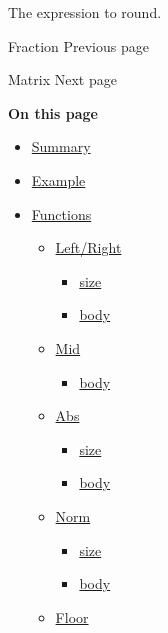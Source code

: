 The expression to round.

\href{/docs/reference/math/frac/}{\pandocbounded{}}

{ Fraction } { Previous page }

\href{/docs/reference/math/mat/}{\pandocbounded{}}

{ Matrix } { Next page }

\textbf{On this page}

\begin{itemize}
\tightlist
\item
  \hyperref[summary]{Summary}
\item
  \hyperref[example]{Example}
\item
  \hyperref[functions]{Functions}

  \begin{itemize}
  \tightlist
  \item
    \hyperref[functions-lr]{Left/Right}

    \begin{itemize}
    \tightlist
    \item
      \hyperref[functions-lr-size]{size}
    \item
      \hyperref[functions-lr-body]{body}
    \end{itemize}
  \item
    \hyperref[functions-mid]{Mid}

    \begin{itemize}
    \tightlist
    \item
      \hyperref[functions-mid-body]{body}
    \end{itemize}
  \item
    \hyperref[functions-abs]{Abs}

    \begin{itemize}
    \tightlist
    \item
      \hyperref[functions-abs-size]{size}
    \item
      \hyperref[functions-abs-body]{body}
    \end{itemize}
  \item
    \hyperref[functions-norm]{Norm}

    \begin{itemize}
    \tightlist
    \item
      \hyperref[functions-norm-size]{size}
    \item
      \hyperref[functions-norm-body]{body}
    \end{itemize}
  \item
    \hyperref[functions-floor]{Floor}


\end{itemize}
\end{itemize}
